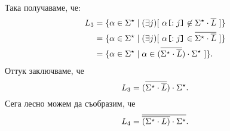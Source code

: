 \begin{extra}
\begin{hint}
\begin{align*}
  \end{align*}
  Така получаваме, че:
  \begin{align*}
    L_3 & = \{\alpha \in \Sigma^\star \mid (\exists j)[\ \alpha\slice{:j} \not\in \Sigma^\star \cdot \ov{L}\ ]\}\\
        & = \{\alpha \in \Sigma^\star \mid (\exists j)[\ \alpha\slice{:j} \in \ov{\Sigma^\star \cdot \ov{L}}\ ]\}\\
        & = \{\alpha \in \Sigma^\star \mid \alpha \in (\ov{\Sigma^\star \cdot \ov{L}}) \cdot \Sigma^\star \ ]\}.
  \end{align*}
  Оттук заключваме, че
  \[L_3 = (\overline{\Sigma^\star \cdot \overline{L}}) \cdot \Sigma^\star.\]
  Сега лесно можем да съобразим, че
  \[ L_4 = \overline{ \overline{(\Sigma^\star \cdot L)} \cdot \Sigma^\star}.\]
\end{hint}
\fi


\end{extra}
